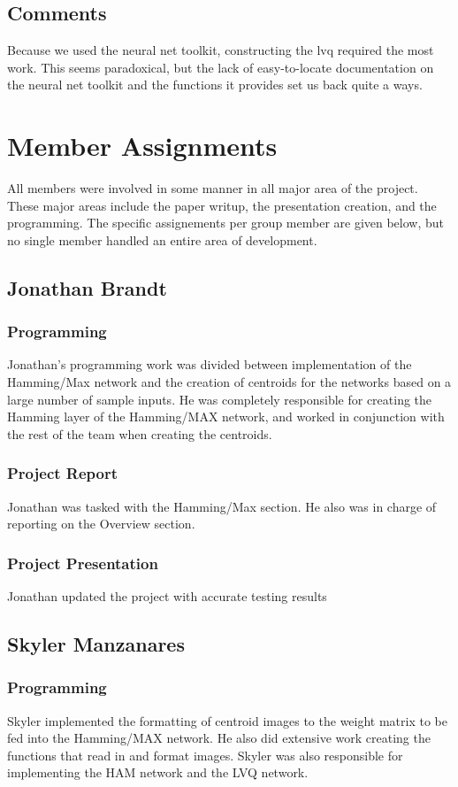 \documentclass{article}
\begin{document}
\subsection{Comments}
Because we used the neural net toolkit, constructing the lvq required the most work. This seems paradoxical, but the lack of easy-to-locate documentation on the neural net toolkit and the functions it provides set us back quite a ways. 
 
\section{Member Assignments}
All members were involved in some manner in all major area of the project. These
major areas include the paper writup, the presentation creation, and the 
programming. The specific assignements per group member are given below, but no
single member handled an entire area of development.
\subsection{Jonathan Brandt}
\subsubsection{Programming}
Jonathan's programming work was divided between implementation of the 
Hamming/Max network and the creation of centroids for the networks based on a
large number of sample inputs. He was completely responsible for creating the Hamming layer of the Hamming/MAX network, and worked in conjunction with the rest of the team when creating the centroids. 

\subsubsection{Project Report}
Jonathan was tasked with the Hamming/Max section. He also was in charge of reporting on the Overview section.

\subsubsection{Project Presentation}
Jonathan updated the project with accurate testing results 

\subsection{Skyler Manzanares}

\subsubsection{Programming}
Skyler implemented the formatting of centroid images to the weight matrix to be fed into the Hamming/MAX network. He also did extensive work creating the functions that read in and format images. Skyler was also responsible for implementing
the HAM network and the LVQ network.
\end{document}
